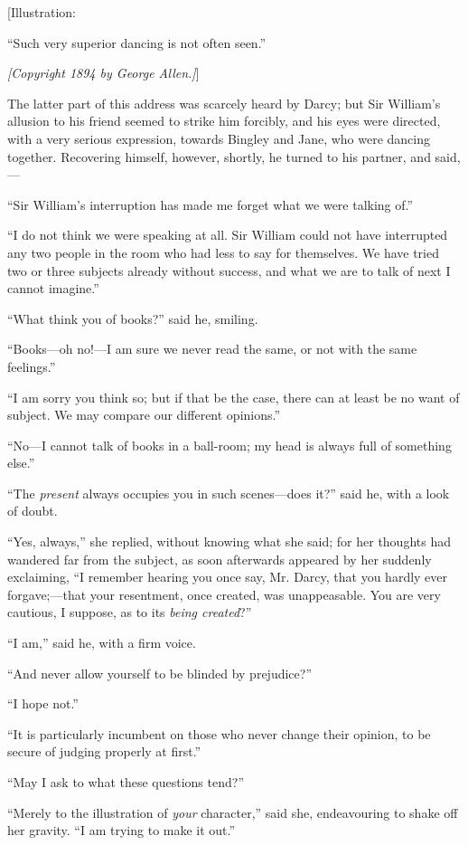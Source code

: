\documentclass[12pt]{book}
\begin{document}
[Illustration:

``Such very superior dancing is not often seen.''

\emph{[\textit{Copyright 1894 by George Allen.}]}]

The latter part of this address was scarcely heard by Darcy; but Sir William's allusion to his friend seemed to strike him forcibly, and his eyes were directed, with a very serious expression, towards Bingley and Jane, who were dancing together. Recovering himself, however, shortly, he turned to his partner, and said,---

``Sir William's interruption has made me forget what we were talking of.''

``I do not think we were speaking at all. Sir William could not have interrupted any two people in the room who had less to say for themselves. We have tried two or three subjects already without success, and what we are to talk of next I cannot imagine.''

``What think you of books?'' said he, smiling.

``Books---oh no!---I am sure we never read the same, or not with the same feelings.''

``I am sorry you think so; but if that be the case, there can at least be no want of subject. We may compare our different opinions.''

``No---I cannot talk of books in a ball-room; my head is always full of something else.''

``The \textit{present} always occupies you in such scenes---does it?'' said he, with a look of doubt.

``Yes, always,'' she replied, without knowing what she said; for her thoughts had wandered far from the subject, as soon afterwards appeared by her suddenly exclaiming, ``I remember hearing you once say, Mr. Darcy, that you hardly ever forgave;---that your resentment, once created, was unappeasable. You are very cautious, I suppose, as to its \textit{being created}?''

``I am,'' said he, with a firm voice.

``And never allow yourself to be blinded by prejudice?''

``I hope not.''

``It is particularly incumbent on those who never change their opinion, to be secure of judging properly at first.''

``May I ask to what these questions tend?''

``Merely to the illustration of \textit{your} character,'' said she, endeavouring to shake off her gravity. ``I am trying to make it out.''
\end{document}
